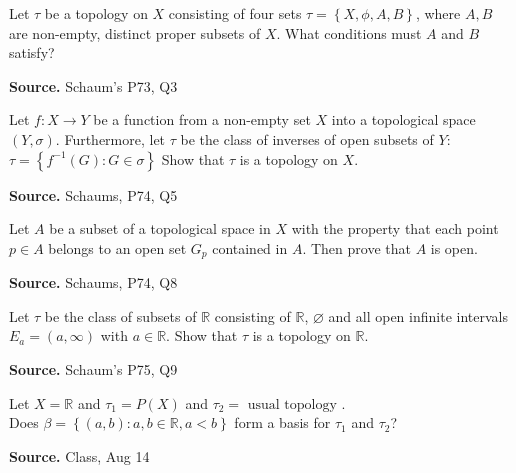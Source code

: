 \documentclass[12pt,twoside]{report}
\newenvironment*{source}{\hfill\scriptsize\textbf{Source.}\space}{\par}
\begin{document}
\begin{samepage}
\begin{ex}
Let $\tau$ be a topology on $X$ consisting of four sets $ \tau = \left\{ X, \phi, A, B \right\} $, where $A, B$ are non-empty, distinct proper subsets of $X$.
What conditions must $A$ and $B$ satisfy?
\end{ex}
\begin{source}
Schaum's P73, Q3
\end{source}
\end{samepage}

\begin{samepage}
\begin{ex}
Let $f \colon X \to Y$ be a function from a non-empty set $X$ into a topological space $\left (Y, \sigma\right )$.
Furthermore, let $\tau$ be the class of inverses of open subsets of $Y$:
$\tau = \left\{ f^{-1} \left (G\right )  :  G \in \sigma \right\} $
Show that $\tau$ is a topology on $X$.
\end{ex}
\begin{source}
Schaums, P74, Q5
\end{source}
\end{samepage}

\begin{samepage}
\begin{ex}
Let $A$ be a subset of a topological space in $X$ with the property that each point $p \in A$ belongs to an open set $G_p$ contained in $A$. 
Then prove that $A$ is open.
\end{ex}
\begin{source}
Schaums, P74, Q8
\end{source}
\end{samepage}

\begin{samepage}
\begin{ex}
Let $\tau$ be the class of subsets of $\mathbb{R}$ consisting of $\mathbb{R}$, $\varnothing$ and all open infinite intervals $E_a = \left (a, \infty\right )$ with $a \in \mathbb{R}$.
Show that $\tau$ is a topology on $\mathbb{R}$.
\end{ex}
\begin{source}
Schaum's P75, Q9
\end{source}
\end{samepage}

\begin{samepage}
\begin{ex}
    Let $X = \mathbb{R}$ and $\tau_1 = P\left (X\right )$ and $\tau_2 = \text{ usual topology }$. \\
    Does $\beta = \left\{ \left (a,b\right )  :  a,b \in \mathbb{R}, a < b \right\}$ form a basis for $\tau_1$ and $\tau_2$?
\end{ex}
\begin{source}
    Class, Aug 14
\end{source}
\end{samepage}
\end{document}
